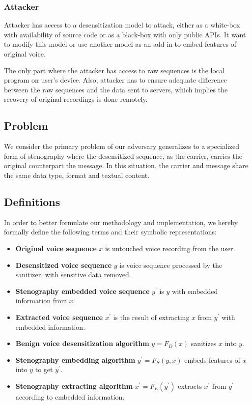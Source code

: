 \documentclass[journal]{IEEEtran} %
\begin{document}
\subsubsection{Attacker}

Attacker has access to a desensitization model to attack, either as a white-box with availability of source code or as a black-box with only public APIs. It want to modify this model or use another model as an add-in to embed features of original voice.

The only part where the attacker has access to raw sequences is the local program on user's device. Also, attacker has to ensure adequate difference between the raw sequences and the data sent to servers, which implies the recovery of original recordings is done remotely.

\subsection{Problem}

We consider the primary problem of our adversary generalizes to a specialized form of stenography where the desensitized sequence, as the carrier, carries the original counterpart the message. In this situation, the carrier and message share the same data type, format and textual content.

\subsection{Definitions}

In order to better formulate our methodology and implementation, we hereby formally define the following terms and their symbolic representations:

\begin{itemize}
    \item \textbf{Original voice sequence} $x$ is untouched voice recording from the user.
    \item \textbf{Desensitized voice sequence} $y$ is voice sequence processed by the sanitizer, with sensitive data removed.
    \item \textbf{Stenography embedded voice sequence} $y^{\prime}$ is $y$ with embedded information from $x$.
    \item \textbf{Extracted voice sequence} $x^{\prime}$ is the result of extracting $x$ from $y^{\prime}$ with embedded information.
    \item \textbf{Benign voice desensitization algorithm} $y = F_D(x)$ sanitizes $x$ into $y$.
    \item \textbf{Stenography embedding algorithm} $y^{\prime} = F_S(y, x)$ embeds features of $x$ into $y$ to get $y^{\prime}$.
    \item \textbf{Stenography extracting algorithm} $x^{\prime} = F_E(y^{\prime})$ extracts $x^{\prime}$ from $y^{\prime}$ according to embedded information.
\end{itemize}
\end{document}
